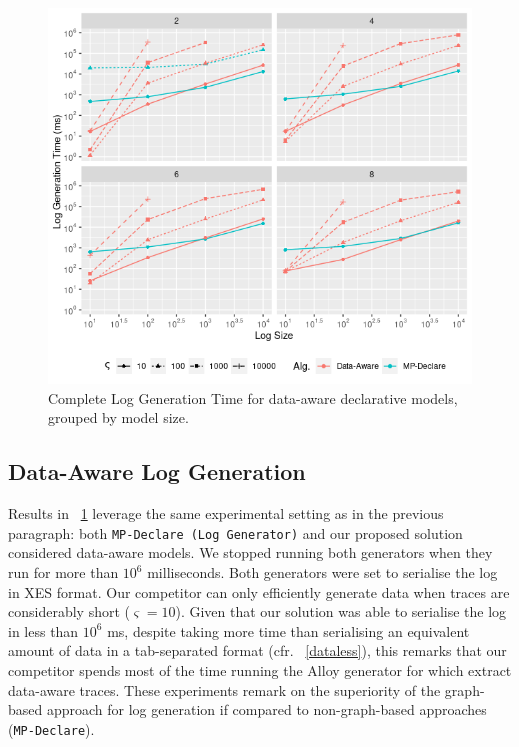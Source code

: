 \documentclass[sigconf]{acmart}
\begin{document}
\begin{figure}[!t]
\centering
\includegraphics[width=\linewidth]{fig/Datamer.png}
\caption{Complete Log Generation Time for data-aware declarative models, grouped by model size.}\label{dataware}
\end{figure}
\subsection{Data-Aware Log Generation}\label{ssec:dataaware}
Results in \figurename~\ref{dataware} leverage the same experimental setting as in the previous paragraph: both \texttt{MP-Declare (Log Generator)} and our proposed solution considered data-aware models. We stopped running both generators when they run for more than $10^6$ milliseconds. Both generators were set to serialise the log in XES format. Our competitor can only efficiently generate data when traces are considerably short ($\varsigma=10$). Given that our solution was able to serialise the log in less than $10^6$ ms, despite taking more time than serialising an equivalent amount of data in a tab-separated format (cfr. \figurename~\ref{dataless}), this remarks that our competitor spends most of the time running the Alloy generator for which extract data-aware traces. These experiments remark on the superiority of the graph-based approach for log generation if compared to non-graph-based approaches (\texttt{MP-Declare}).
\end{document}
